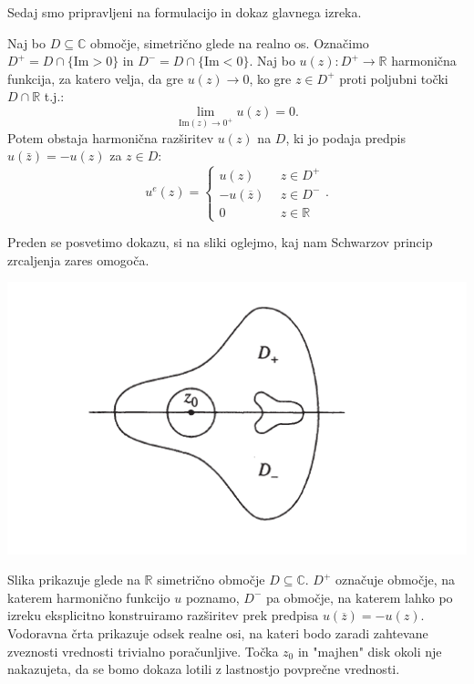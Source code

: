 \documentclass[mat1]{fmfdelo}
\newcommand{\R}{\mathbb R}
\newcommand{\C}{\mathbb C}
\begin{document}
    Sedaj smo pripravljeni na formulacijo in dokaz glavnega izreka.
    \begin{izrek}
        Naj bo $D \subseteq \C$ območje, simetrično glede na realno os. 
        Označimo $D^{+} = D \cap \{\text{Im} > 0\}$ in $D^{-} = D \cap \{\text{Im} < 0\}$.
        \newline
        Naj bo $u(z): D^{+} \to \mathbb{R}$ harmonična funkcija, za katero velja, da gre $u(z) \to 0$, ko gre $z \in D^{+}$ proti poljubni točki $D \cap \mathbb{R}$ t.j.: $$\lim_{\text{Im}(z) \to 0^+} u(z) = 0.$$
        Potem obstaja harmonična razširitev $u(z)$ na $D$, ki jo podaja predpis $u(\bar{z}) = - u(z)$ za $z \in D$:
        $$
            u^e(z) = 
            \begin{cases}
                u(z)~~&z \in D^{+}\\
                -u(\overline{z})~~&z \in D^{-}\\
                0~~ &z \in \mathbb{R}
            \end{cases}
            .
        $$
    \end{izrek}
    Preden se posvetimo dokazu, si na sliki oglejmo, kaj nam Schwarzov princip zrcaljenja zares omogoča.
    \begin{center}
        \includegraphics[width = 0.8 \textwidth]{schwarzov_princip_zrcaljenja.png}
    \end{center}
    Slika prikazuje glede na $\R$ simetrično območje $D \subseteq \C$. $D^{+}$ označuje območje, na katerem harmonično funkcijo $u$ poznamo, $D^{-}$ pa območje, na katerem lahko po izreku eksplicitno konstruiramo razširitev prek predpisa $u(\overline{z}) = - u(z)$.
    Vodoravna črta prikazuje odsek realne osi, na kateri bodo zaradi zahtevane zveznosti vrednosti trivialno poračunljive. 
    Točka $z_0$ in "majhen" disk okoli nje nakazujeta, da se bomo dokaza lotili z lastnostjo povprečne vrednosti.
\end{document}
